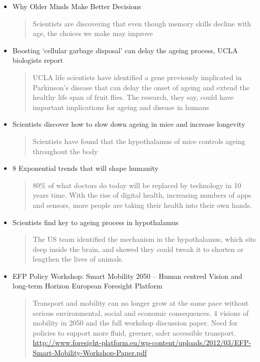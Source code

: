 \begin{itemize}
\begin{quotation}
Age friendly cities need investment in all sorts of infrastructures from longer crossing times to more street shelters and seats. Agelab from MIT helps designers understand the effects of ageing. Walkable communities will be critical.\end{quotation}
\item Why Older Minds Make Better Decisions
\begin{quotation}
Scientists are discovering that even though memory skills decline with age, the choices we make may improve\end{quotation}
\item Boosting `cellular garbage disposal' can delay the ageing process, UCLA biologists report
\begin{quotation}
UCLA life scientists have identified a gene previously implicated in Parkinson's disease that can delay the onset of ageing and extend the healthy life span of fruit flies. The research, they say, could have important implications for ageing and disease in humans\end{quotation}
\item Scientists discover how to slow down ageing in mice and increase longevity
\begin{quotation}
Scientists have found that the hypothalamus of mice controls ageing throughout the body\end{quotation}
\item 8 Exponential trends that will shape humanity
\begin{quotation}
80\% of what doctors do today will be replaced by technology in 10 years time. With the rise of digital health, increasing numbers of apps and sensors, more people are taking their health into their own hands.\end{quotation}
\item Scientists find key to ageing process in hypothalamus
\begin{quotation}
The US team identified the mechanism in the hypothalamus, which sits deep inside the brain, and showed they could tweak it to shorten or lengthen the lives of animals.\end{quotation}
\item EFP Policy Workshop: Smart Mobility 2050 -- Human centred Vision and long-term Horizon \textregistered European Foresight Platform
\begin{quotation}
Transport and mobility can no longer grow at the same pace without serious environmental, social and economic consequences. 4 visions of mobility in 2050 and the full workshop discussion paper. Need for policies to support more fluid, greener, safer accessible transport.  \url{http://www.foresight-platform.eu/wp-content/uploads/2012/03/EFP-Smart-Mobility-Workshop-Paper.pdf}\end{quotation}

\end{itemize}
